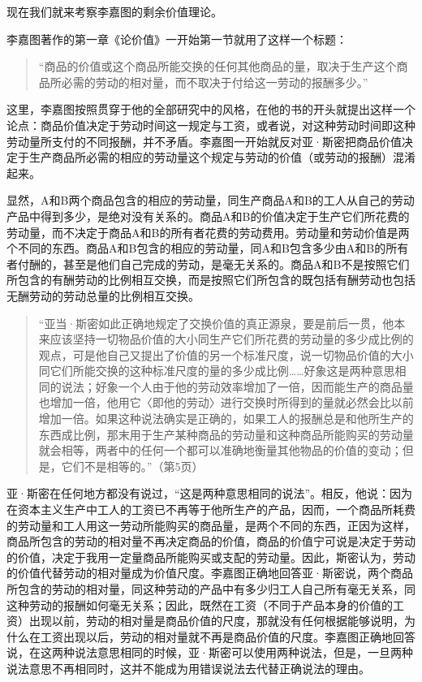 现在我们就来考察李嘉图的剩余价值理论。



李嘉图著作的第一章《论价值》一开始第一节就用了这样一个标题：

\begin{quote}{“商品的价值或这个商品所能交换的任何其他商品的量，取决于生产这个商品所必需的劳动的相对量，而不取决于付给这一劳动的报酬多少。”}\end{quote}

这里，李嘉图按照贯穿于他的全部研究中的风格，在他的书的开头就提出这样一个论点：商品价值决定于劳动时间这一规定与工资，或者说，对这种劳动时间即这种劳动量所支付的不同报酬，并不矛盾。李嘉图一开始就反对亚·斯密把商品价值决定于生产商品所必需的相应的劳动量这个规定与劳动的价值（或劳动的报酬）混淆起来。

显然，A和B两个商品包含的相应的劳动量，同生产商品A和B的工人从自己的劳动产品中得到多少，是绝对没有关系的。商品A和B的价值决定于生产它们所花费的劳动量，而不决定于商品A和B的所有者花费的劳动费用。劳动量和劳动价值是两个不同的东西。商品A和B包含的相应的劳动量，同A和B包含多少由A和B的所有者付酬的，甚至是他们自己完成的劳动，是毫无关系的。商品A和B不是按照它们所包含的有酬劳动的比例相互交换，而是按照它们所包含的既包括有酬劳动也包括无酬劳动的劳动总量的比例相互交换。

\begin{quote}{“亚当·斯密如此正确地规定了交换价值的真正源泉，要是前后一贯，他本来应该坚持一切物品价值的大小同生产它们所花费的劳动量的多少成比例的观点，可是他自己又提出了价值的另一个标准尺度，说一切物品价值的大小同它们所能交换的这种标准尺度的量的多少成比例……好象这是两种意思相同的说法；好象一个人由于他的劳动效率增加了一倍，因而能生产的商品量也增加一倍，他用它〈即他的劳动〉进行交换时所得到的量就必然会比以前增加一倍。如果这种说法确实是正确的，如果工人的报酬总是和他所生产的东西成比例，那末用于生产某种商品的劳动量和这种商品所能购买的劳动量就会相等，两者中的任何一个都可以准确地衡量其他物品的价值的变动；但是，它们不是相等的。”（第5页）}\end{quote}

亚·斯密在任何地方都没有说过，“这是两种意思相同的说法”。相反，他说：因为在资本主义生产中工人的工资已不再等于他所生产的产品，因而，一个商品所耗费的劳动量和工人用这一劳动所能购买的商品量，是两个不同的东西，正因为这样，商品所包含的劳动的相对量不再决定商品的价值，商品的价值宁可说是决定于劳动的价值，决定于我用一定量商品所能购买或支配的劳动量。因此，斯密认为，劳动的价值代替劳动的相对量成为价值尺度。李嘉图正确地回答亚·斯密说，两个商品所包含的劳动的相对量，同这种劳动的产品中有多少归工人自己所有毫无关系，同这种劳动的报酬如何毫无关系；因此，既然在工资（不同于产品本身的价值的工资）出现以前，劳动的相对量是商品价值的尺度，那就没有任何根据能够说明，为什么在工资出现以后，劳动的相对量就不再是商品价值的尺度。李嘉图正确地回答说，在这两种说法意思相同的时候，亚·斯密可以使用两种说法，但是，一旦两种说法意思不再相同时，这并不能成为用错误说法去代替正确说法的理由。

